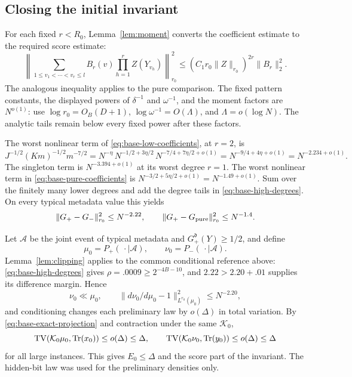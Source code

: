 \subsection{Closing the initial invariant}

For each fixed \(r<R_0\), Lemma~\ref{lem:moment} converts the coefficient estimate to the required score estimate:
\[
 \left\|\sum_{1\le v_1<\cdots<v_r\le l}
       B_r(v)\prod_{h=1}^r Z(Y_{v_h})\right\|_{r_0}^2
 \le (C_1r_0\|Z\|_{r_0})^{2r}\|B_r\|_2^2.
\]
The analogous inequality applies to the pure comparison. The fixed pattern constants, the displayed powers of \(\delta^{-1}\) and \(\omega^{-1}\), and the moment factors are \(N^{o(1)}\): use
\(\log r_0=O_B(D+1)\), \(\log\omega^{-1}=O(\Lambda)\), and
\(\Lambda=o(\log N)\). The analytic tails remain below every fixed power after these factors.

The worst nonlinear term of \eqref{eq:base-low-coefficients}, at \(r=2\), is
\[
 J^{-1/2}(Km)^{-1/2}m^{-7/2}
 =N^{-\eta}\,N^{-1/2+3\eta/2}\,
       N^{-7/4+7\eta/2+o(1)}
 =N^{-9/4+4\eta+o(1)}=N^{-2.234+o(1)}.
\]
The singleton term is \(N^{-3.394+o(1)}\) at its worst degree \(r=1\). The worst nonlinear term in \eqref{eq:base-pure-coefficients} is
\(N^{-3/2+5\eta/2+o(1)}=N^{-1.49+o(1)}\).
Sum over the finitely many lower degrees and add the degree tails in \eqref{eq:base-high-degrees}. On every typical metadata value this yields
\begin{equation}\label{eq:base-score-differences}
 \|G_+-G_-\|_{r_0}^2\le N^{-2.22},\qquad
 \|G_+-G_{\rm pure}\|_{r_0}^2\le N^{-1.4}.
\end{equation}

Let \(\mathcal A\) be the joint event of typical metadata and
\(G_+^{\mathfrak d}(Y)\ge1/2\), and define
\[
 \mu_0=P_+(\,\cdot\mid\mathcal A),\qquad
 \nu_0=P_-(\,\cdot\mid\mathcal A).
\]
Lemma~\ref{lem:clipping} applies to the common conditional reference above: \eqref{eq:base-high-degrees} gives
\(\rho=.0009\ge2^{-4B-10}\), and \(2.22>2.20+.01\) supplies its difference margin. Hence
\[
 \nu_0\ll\mu_0,\qquad
 \|d\nu_0/d\mu_0-1\|_{L^{r_0}(\mu_0)}^2\le N^{-2.20},
\]
and conditioning changes each preliminary law by \(o(\Delta)\) in total variation. By \eqref{eq:base-exact-projection} and contraction under the same \(\mathcal K_0\),
\[
 \operatorname{TV}(\mathcal K_0\mu_0,\mathrm{Tr}(x_0))\le o(\Delta)\le\Delta,\qquad
 \operatorname{TV}(\mathcal K_0\nu_0,\mathrm{Tr}(y_0))\le o(\Delta)\le\Delta
\]
for all large instances. This gives \(E_0\le\Delta\) and the score part of the invariant. The hidden-bit law was used for the preliminary densities only.

